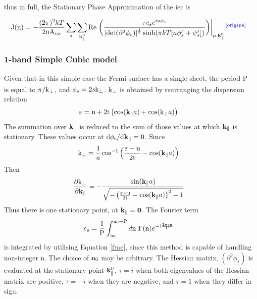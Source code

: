 \documentclass[a4paper, 12pt]{article}
\newcommand{\site}[1]{\textsuperscript{\textcolor{blue}{\cite{#1}}}}
\begin{document}
\normalsize \justify \quad 
thus in full, the Stationary Phase Approximation of the \gls{iec} is

\begin{equation}
	{\rm J(n)} = -\frac{(2\pi)^2{kT}}{2{\rm nA_{\scriptscriptstyle BZ}}}\sum_s \sum_{{\bf k}_\parallel^0}{\rm Re}\left.\left(\frac{\tau  c_se^{i{\rm n}\phi_s}}{\vert {\rm det}(\partial^2\phi_s)\vert^\frac{1}{2}\sinh(\pi kT[n\phi_s '+\psi_s '])} \right) \right|_{\mu , {\bf k}_\parallel^0}\site{origspa}
\end{equation}
\subsubsection{1-band Simple Cubic model}
	Given that in this simple case the Fermi surface has a single sheet, the period P is equal to $\rm \pi/k_\perp$, and $\phi_s = 2s\rm k_\perp$\textcolor{blue}{\textsuperscript{\cite{rev3}}}.
	$\rm k_\perp$ is obtained by rearranging the dispersion relation
	\begin{equation}\label{dispersion}
		\rm \varepsilon = u + 2t\left(\cos(\bf k_\parallel \mathnormal a)+\cos(\rm k_\perp \mathnormal a)\right)	
	\end{equation}
	The summation over $\rm\bf k_\parallel$ is reduced to the sum of those values at which $\rm\bf k_\parallel$ is stationary. These values occur at $\rm d\phi_s/d\bf k_\parallel = \rm0$.
	Since
	\begin{equation}
		\rm k_\perp = \frac{1}{\mathnormal a}\cos^{-1}\Big(\frac{\varepsilon - u}{2t} - \cos(\bf k_\parallel \mathnormal a)\Big)
	\end{equation}
	Then
	\begin{equation}
		\rm \frac{\partial k_\perp}{\partial\bf k_\parallel} = -\frac{\sin(\bf k_\parallel\mathnormal a)}{\sqrt{-\left(\frac{\varepsilon - u}{2t}-\cos(\bf k_\parallel \mathnormal a)\right)^{\rm 2} -\rm 1}}
	\end{equation}
	Thus there is one stationary point, at $\rm\bf k_\parallel = 0$.
	The Fourier term
	\begin{equation}
		c_s= \frac{1}{\rm P} \int_{{\rm n}_0}^{{\rm n}_0+{\rm P}} d{\rm n \;F(n)}e^{- i\frac{2\pi s \rm n}{\rm P}}
	\end{equation}
	is integrated by utilising Equation \eqref{frac}, since this method is capable of handling non-integer n. The choice of $\rm n_0$ may be arbitrary.
	The Hessian matrix, $(\partial^2 \phi_s)$ is evaluated at the stationary point $\rm \bf k_\parallel^{\rm 0}$.
	$\tau=i$ when both eigenvalues of the Hessian matrix are positive, $\tau=-i$ when they are negative, and $\tau=1$ when they differ in sign.
\end{document}
